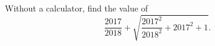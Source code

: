 Without a calculator, find the value of
\[
\dfrac{2017}{2018}+\sqrt{\dfrac{2017^2}{2018^2}+2017^2+1}.
\]
